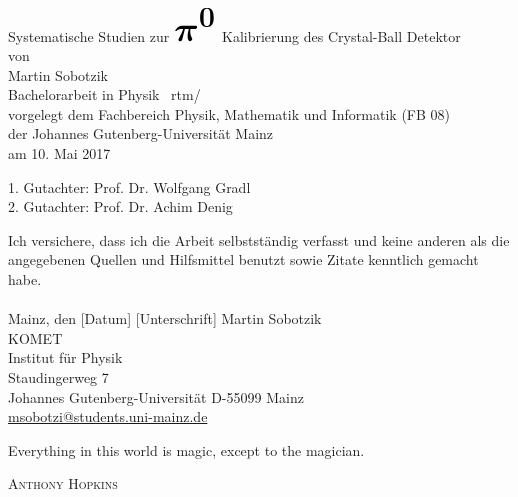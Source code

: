 \documentclass[a4paper,11pt,oneside,final,german,openbib,pdftex]{scrbook}
\begin{document}

\begin{titlepage}
  \vspace*{6mm}
  \begin{center}
     {\afont Systematische Studien zur 
     	$
     	\mathlarger{\mathlarger{\mathlarger{\mathlarger{\mathlarger{\mathlarger{\boldsymbol{
     										\pi^0
     									}}}}}}}
     	$ 
     	Kalibrierung des Crystal-Ball Detektor}
     \\[3.5cm]
     {\large von}
     \\[3.5cm]
     {\dfont Martin Sobotzik}
     \\[2cm]
     {\large Bachelorarbeit in Physik \ rtm/\\
        vorgelegt dem Fachbereich Physik, Mathematik und Informatik (FB 08) \/\\
        der Johannes Gutenberg-Universit\"at Mainz \/\\
        am 10. Mai 2017}
   \end{center}
   \vfill
   1. Gutachter: Prof. Dr. Wolfgang Gradl\\	
   2. Gutachter: Prof. Dr. Achim Denig \\
   \vfill
\end{titlepage}

\thispagestyle{empty}
Ich versichere, dass ich die Arbeit selbstst\"andig verfasst und keine 
anderen als die angegebenen Quellen und Hilfsmittel benutzt sowie 
Zitate kenntlich gemacht habe.
\\
\\[3.5cm] 
Mainz, den [Datum] [Unterschrift]
\vfill
\noindent 
Martin Sobotzik\\
KOMET\\
Institut f\"ur Physik\\
Staudingerweg 7\\
Johannes Gutenberg-Universit\"at
D-55099 Mainz\\
{\url{ msobotzi@students.uni-mainz.de}}

\newpage \epigraph{Everything in this world is magic, except to the magician.}{\footnotesize\textsc{Anthony Hopkins}}


\renewcommand\contentsname{Inhaltsverzeichnis}
\renewcommand\figurename{Abbildung}
\renewcommand\tablename{Tabelle}
\tableofcontents
\clearpage

\mainmatter
\sloppy
\end{document}
